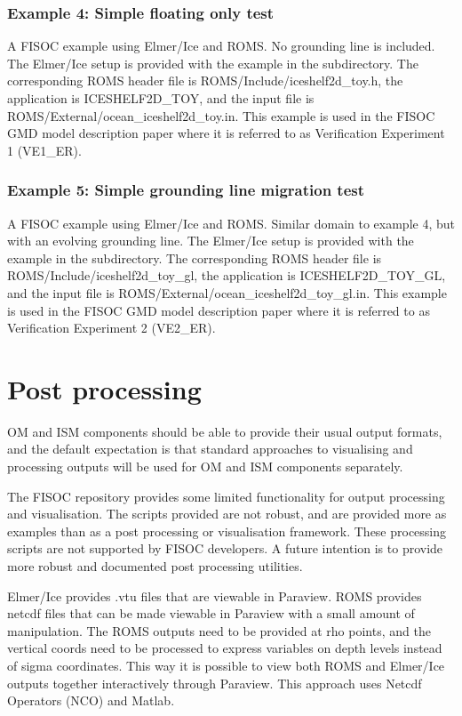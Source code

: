 \documentclass[11pt]{article}
\begin{document}
\subsubsection{Example 4: Simple floating only test}
A FISOC example using Elmer/Ice and ROMS. No grounding line is included. 
The Elmer/Ice setup is provided with the example in the subdirectory. 
The corresponding ROMS header file is ROMS/Include/iceshelf2d\_toy.h, 
the application is ICESHELF2D\_TOY, 
and the input file is ROMS/External/ocean\_iceshelf2d\_toy.in.
This example is used in the FISOC GMD model description paper where it is
referred to as Verification Experiment 1 (VE1\_ER).

\subsubsection{Example 5: Simple grounding line migration test}
A FISOC example using Elmer/Ice and ROMS. Similar domain to 
example 4, but with an evolving grounding line.
The Elmer/Ice setup is provided with the example in the subdirectory. 
The corresponding ROMS header file is ROMS/Include/iceshelf2d\_toy\_gl, 
the application is ICESHELF2D\_TOY\_GL, 
and the input file is ROMS/External/ocean\_iceshelf2d\_toy\_gl.in.
This example is used in the FISOC GMD model description paper where it is
referred to as Verification Experiment 2 (VE2\_ER).



\section{Post processing}

OM and ISM components should be able to provide their usual output formats,  
and the default expectation is that standard approaches to visualising and 
processing outputs will be used for OM and ISM components separately. 

The FISOC repository provides some limited functionality for output processing and
visualisation. 
The scripts provided are not robust, and are provided more as examples than as a
post processing or visualisation framework. 
These processing scripts are not supported by FISOC developers. 
A future intention  is to provide more robust and documented post processing
utilities. 

Elmer/Ice provides .vtu files that are viewable in Paraview.
ROMS provides netcdf files that can be made viewable in Paraview with a small amount
of manipulation.
The ROMS outputs need to be provided at rho points, and the vertical coords need to be processed to
express variables on depth levels instead of sigma coordinates. 
This way it is possible to view both ROMS and Elmer/Ice outputs together interactively through Paraview. 
This approach uses Netcdf Operators (NCO) and Matlab. 
\end{document}
